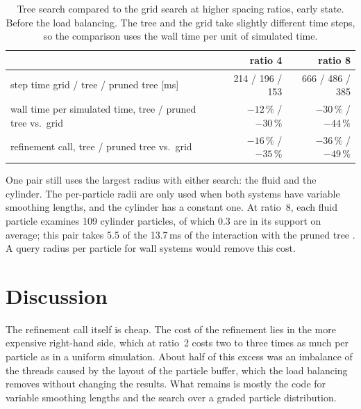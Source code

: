 \begin{table}[htb]
  \centering
  \caption{Tree search compared to the grid search at higher spacing ratios, early state.
  Before the load balancing. The tree and the grid take slightly different time steps,
  so the comparison uses the wall time per unit of simulated time. }
  \label{tab:performance-ratio}
  \small
  \begin{tabular}{lrr}
    \toprule
    & ratio 4 & ratio 8 \\
    \midrule
    step time grid / tree / pruned tree [ms] & 214 / 196 / 153 & 666 / 486 / 385 \\
    wall time per simulated time, tree / pruned tree vs.\ grid &
      $-12\,\%$ / $-30\,\%$ & $-30\,\%$ / $-44\,\%$ \\
    refinement call, tree / pruned tree vs.\ grid & $-16\,\%$ / $-35\,\%$ &
      $-36\,\%$ / $-49\,\%$ \\
    \bottomrule
  \end{tabular}
\end{table}

One pair still uses the largest radius with either search: the fluid and the cylinder. The
per-particle radii are only used when both systems have variable smoothing lengths, and the
cylinder has a constant one. At ratio~8, each fluid particle examines 109 cylinder
particles, of which 0.3 are in its support on average; this pair takes 5.5 of the 13.7\,ms
of the interaction with the pruned tree . A query radius per particle for wall
systems would remove this cost.

\section{Discussion}
\label{sec:performance-discussion}

The refinement call itself is cheap. The cost of the refinement lies in the more expensive
right-hand side, which at ratio~2 costs two to three times as much per particle as in a
uniform simulation. About half of this excess was an imbalance of the threads caused by the
layout of the particle buffer, which the load balancing removes without changing the
results. What remains is mostly the code for variable smoothing lengths and the search over
a graded particle distribution.

